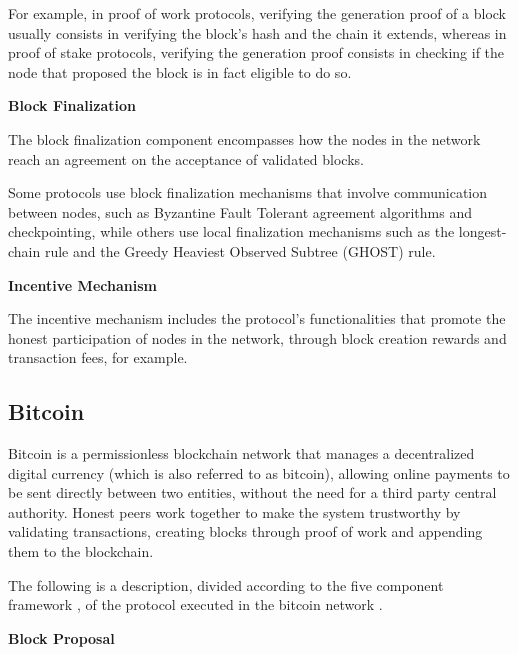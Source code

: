 For example, in proof of work protocols, verifying the generation proof of a block usually consists in verifying the block’s hash and the chain it extends, whereas in proof of stake protocols, verifying the generation proof consists in checking if the node that proposed the block is in fact eligible to do so.

\vspace{0.25cm}

\textbf{Block Finalization}

The block finalization component encompasses how the nodes in the network reach an agreement on the acceptance of validated blocks.

Some protocols use block finalization mechanisms that involve communication between nodes, such as Byzantine Fault Tolerant agreement algorithms and checkpointing, while others use local finalization mechanisms such as the longest-chain rule and the Greedy Heaviest Observed Subtree (GHOST) rule.

\vspace{0.25cm}

\textbf{Incentive Mechanism}

The incentive mechanism includes the protocol’s functionalities that promote the honest participation of nodes in the network, through block creation rewards and transaction fees, for example.





\subsection{Bitcoin}

Bitcoin \cite{bitcoin} is a permissionless blockchain network that manages a decentralized digital currency (which is also referred to as bitcoin), allowing online payments to be sent directly between two entities, without the need for a third party central authority. Honest peers work together to make the system trustworthy by validating transactions, creating blocks through proof of work and appending them to the blockchain.

The following is a description, divided according to the five component framework \cite{survey_bchain_networks}, of the protocol executed in the bitcoin network \cite{bitcoin} \cite{info_propagation_bitcoin}.


\vspace{0.5cm}

\textbf{Block Proposal}

